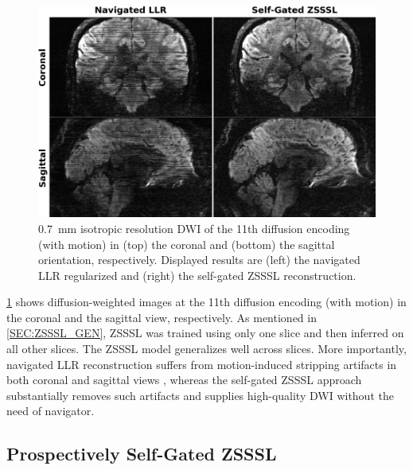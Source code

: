 \documentclass[journal,twoside,web]{ieeecolor}
\begin{document}
	\begin{figure}
		\centering
		\includegraphics[width=\columnwidth]{../figures/fig5.png}
		\caption{\SI{0.7}{\milli\meter} isotropic resolution DWI
			of the 11th diffusion encoding (with motion)
			in (top) the coronal and (bottom) the sagittal orientation, respectively.
			Displayed results are (left) the navigated LLR regularized
			and (right) the self-gated ZSSSL reconstruction.}
		\label{FIG:MOTION_RETRO_2}
	\end{figure}

	\cref{FIG:MOTION_RETRO_2} shows diffusion-weighted images
	at the 11th diffusion encoding (with motion)
	in the coronal and the sagittal view, respectively.
	As mentioned in \cref{SEC:ZSSSL_GEN}, ZSSSL was trained using only one slice
	and then inferred on all other slices.
	The ZSSSL model generalizes well across slices.
	More importantly, navigated LLR reconstruction suffers from motion-induced
	stripping artifacts in both coronal and sagittal views \cite{chang_2021_musium},
	whereas the self-gated ZSSSL approach substantially removes such artifacts
	and supplies high-quality DWI without the need of navigator.


	\subsection{Prospectively Self-Gated ZSSSL}
\end{document}
